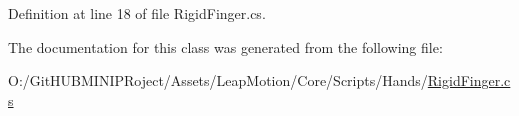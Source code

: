 Definition at line 18 of file Rigid\+Finger.\+cs.



The documentation for this class was generated from the following file\+:\begin{DoxyCompactItemize}
\item 
O\+:/\+Git\+H\+U\+B\+M\+I\+N\+I\+P\+Roject/\+Assets/\+Leap\+Motion/\+Core/\+Scripts/\+Hands/\mbox{\hyperlink{_rigid_finger_8cs}{Rigid\+Finger.\+cs}}\end{DoxyCompactItemize}
